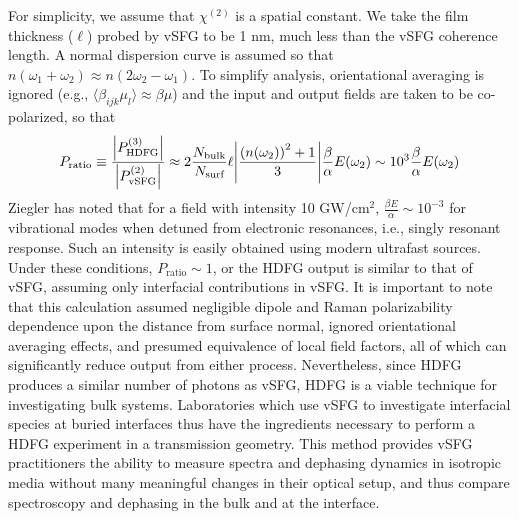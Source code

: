 \documentclass[aip, jcp, reprint, onecolumn, nofootinbib]{revtex4-2}
\begin{document}
For simplicity, we assume that $\chi^{(2)}$ is a spatial constant. 
We take the film thickness ($\ell$) probed by vSFG to be 1 nm, much less than the vSFG coherence length.\cite{RN133}
A normal dispersion curve is assumed so that $n(\omega_1+\omega_2) \approx n(2\omega_2-\omega_1)$.
To simplify analysis, orientational averaging is ignored (e.g., $\langle \beta_{ijk} \mu_{l} \rangle \approx \beta \mu$) and the input and output fields are taken to be co-polarized, so that
\begin{equation}
	P_\text{ratio} \equiv \frac{\abs{P^{(3)}_{\text{HDFG}}}}{\abs{P^{(2)}_{\text{vSFG}}}} \approx 2 \frac{N_\text{bulk}}{N_\text{surf}} \ell \abs{\frac{\left(n(\omega_2)\right)^2 + 1}{3}} \frac{\beta}{\alpha} E(\omega_2) \sim 10^3 \frac{\beta}{\alpha} E(\omega_2)\\
\end{equation}
Ziegler has noted that for a field with intensity 10 GW/cm$^{2}$, $\frac{\beta E}{\alpha} \sim 10^{-3} $ for vibrational modes when detuned from electronic resonances, i.e., singly resonant response. \cite{RN515}
Such an intensity is easily obtained using modern ultrafast sources.
Under these conditions, $P_\text{ratio} \sim 1$, or the HDFG output is similar to that of vSFG, assuming only interfacial contributions in vSFG.
It is important to note that this calculation assumed negligible dipole and Raman polarizability dependence upon the distance from surface normal, ignored orientational averaging effects, and presumed equivalence of local field factors, all of which can significantly reduce output from either process. 
Nevertheless, since HDFG produces a similar number of photons as vSFG, HDFG is a viable technique for investigating bulk systems.
Laboratories which use vSFG to investigate interfacial species at buried interfaces thus have the ingredients necessary to perform a HDFG experiment in a transmission geometry. \cite{Piontek2023_1}
This method provides vSFG practitioners the ability to measure spectra and dephasing dynamics in isotropic media without many meaningful changes in their optical setup, and thus compare spectroscopy and dephasing in the bulk and at the interface.
\end{document}
